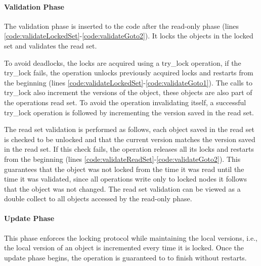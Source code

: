 \paragraph{Validation Phase} 
The validation phase is inserted to the code after
the read-only phase (lines
\ref{code:validateLockedSet}-\ref{code:validateGoto2}). 
It locks the objects in the locked set and validates the read set. 

To avoid deadlocks, the locks are acquired using a try\_lock
operation, if the try\_lock fails, the operation unlocks 
previously acquired locks and restarts from the beginning 
(lines \ref{code:validateLockedSet}-\ref{code:validateGoto1}). 
The calls to try\_lock also increment the versions 
of the object,  these objects are also part of the 
operations read set. 
To avoid the operation invalidating itself, 
a successful try\_lock operation is followed by incrementing
the version saved in the read set.  

The read set validation is performed as follows, 
each object saved in the read set is checked to be unlocked 
and that the current version matches the version saved in the 
read set. If this check fails, the operation releases all its
locks and restarts from the beginning
(lines \ref{code:validateReadSet}-\ref{code:validateGoto2}). 
This guarantees
that the object was not locked from the time it was read until
the time it was validated, since all operations write only to
locked nodes it follows that the object was not changed.  
The read set validation can be viewed as a double collect 
to all objects accessed by the read-only phase. 


  
\paragraph{Update Phase} 
This phase enforces the locking protocol
  while maintaining the local versions, i.e., the local version of 
  an object is incremented every time it is locked.  
  Once the update phase begins, the operation is guaranteed to to 
  finish without restarts.  


